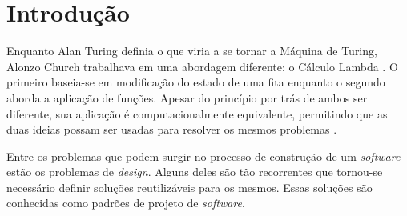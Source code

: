 
\chapter{Introdução}
%

Enquanto Alan Turing definia o que viria a 
se tornar a Máquina de Turing, Alonzo Church 
trabalhava em uma abordagem diferente: o Cálculo Lambda
\cite{church1932set,church1936unsolvable,sep-turing-machine}. 
O primeiro baseia-se em modificação do estado de 
uma fita enquanto o segundo aborda a aplicação 
de funções. Apesar do princípio por trás de ambos 
ser diferente, sua aplicação é computacionalmente 
equivalente, permitindo que as duas ideias possam 
ser usadas para resolver os mesmos problemas
\cite{sep-church-turing}.


Entre os problemas que podem surgir no 
processo de construção de um \textit{software} 
estão os problemas de \textit{design}. Alguns 
deles são tão recorrentes que tornou-se 
necessário definir soluções reutilizáveis 
para os mesmos. Essas soluções são conhecidas 
como padrões de projeto de \textit{software}. 
\cite{gamma:1995}

